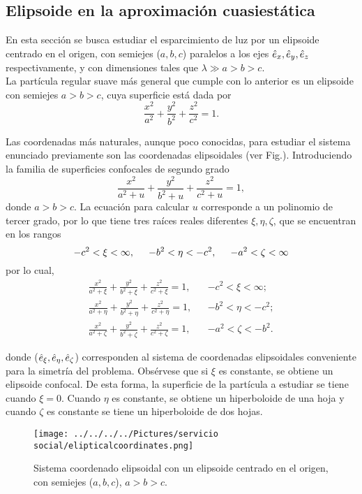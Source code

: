 \subsection{Elipsoide en la aproximación cuasiestática}
En esta sección se busca estudiar el esparcimiento de luz por un elipsoide centrado en el origen, con semiejes ($a,b,c$) paralelos a los ejes $\hat{e}_{x},\hat{e}_{y},\hat{e}_{z}$ respectivamente, y con dimensiones tales que $\lambda\gg a>b>c$.\\


La partícula regular suave más general que cumple con lo anterior es un elipsoide con semiejes $a > b > c$, cuya superficie está dada por 
\begin{equation}
    \frac{x^2}{a^2}+\frac{y^2}{b^2}+\frac{z^2}{c^2}=1.
\end{equation}

Las coordenadas más naturales, aunque poco conocidas, para estudiar el sistema enunciado previamente son las coordenadas elipsoidales (ver Fig.). Introduciendo la familia de superficies confocales de segundo grado \cite{Math}
\begin{equation}
    \frac{x^2}{a^2+u}+\frac{y^2}{b^2+u}+\frac{z^2}{c^2+u}=1,
\end{equation}
donde $a>b>c$. La ecuación para calcular $u$ corresponde a un polinomio de tercer grado, por lo que tiene tres raíces reales diferentes $\xi,\eta,\zeta$, que se encuentran en los rangos
\begin{equation}
    -c^2<\xi<\infty,\hspace{0.5cm}-b^2<\eta<-c^2,\hspace{0.5cm}-a^2<\zeta<\infty
\end{equation}
por lo cual, 
\begin{align}
    \frac{x^2}{a^2+\xi}+\frac{y^2}{b^2+\xi}+\frac{z^2}{c^2+\xi}=1,&& -c^2<\xi<\infty;\\
    \frac{x^2}{a^2+\eta}+\frac{y^2}{b^2+\eta}+\frac{z^2}{c^2+\eta}=1,&& -b^2<\eta<-c^2;\\
    \frac{x^2}{a^2+\zeta}+\frac{y^2}{b^2+\zeta}+\frac{z^2}{c^2+\zeta}=1,&& -a^2<\zeta<-b^2.
\end{align}

donde ($\hat{e}_{\xi},\hat{e}_{\eta},\hat{e}_{\zeta}$) corresponden al sistema de coordenadas elipsoidales  conveniente para la simetría del problema. Obsérvese que si $\xi$ es constante, se obtiene un elipsoide confocal. De esta forma, la superficie de la partícula a estudiar se tiene cuando $\xi=0$. Cuando $\eta$ es constante, se obtiene un hiperboloide de una hoja y cuando $\zeta$ es constante se tiene un hiperboloide de dos hojas.\\
\begin{figure}[H]
    \centering
    \texttt{[image: ../../../../Pictures/servicio social/elipticalcoordinates.png]} 
    \caption{Sistema coordenado elipsoidal con un elipsoide centrado en el origen, con semiejes ($a, b, c$), $a > b > c.$}
    \label{fig:enter-label}
\end{figure}

